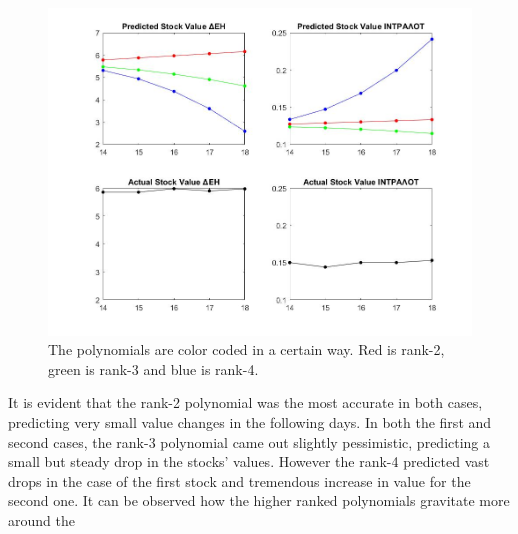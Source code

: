 \documentclass{article}
\begin{document}
\begin{figure}[h]
\centering
\includegraphics[scale=0.5]{images/stock_value_comparison.jpg}
\caption{The polynomials are color coded in a certain way. Red is rank-2, green is rank-3 and blue is rank-4.}
\end{figure}
\linebreak It is evident that the rank-2 polynomial was the most accurate in both cases, predicting very small value changes in the following days. In both the first and second cases, the rank-3 polynomial came out slightly pessimistic, predicting a small but steady drop in the stocks' values. However the rank-4 predicted vast drops in the case of the first stock and tremendous increase in value for the second one. It can be observed how the higher ranked polynomials gravitate more around the
\end{document}
